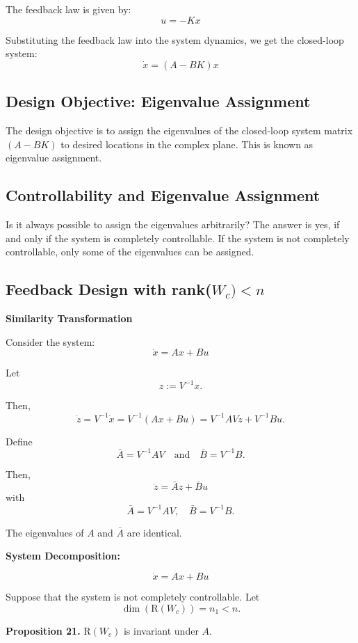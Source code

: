 \documentclass{article}
\begin{document}
The feedback law is given by:
\[
u = -Kx
\]

Substituting the feedback law into the system dynamics, we get the closed-loop system:
\[
\dot{x} = (A - BK)x
\]

\subsection{Design Objective: Eigenvalue Assignment}
The design objective is to assign the eigenvalues of the closed-loop system matrix $(A - BK)$ to desired locations in the complex plane. This is known as eigenvalue assignment.

\subsection{Controllability and Eigenvalue Assignment}
Is it always possible to assign the eigenvalues arbitrarily? The answer is yes, if and only if the system is completely controllable. If the system is not completely controllable, only some of the eigenvalues can be assigned.

\subsection{Feedback Design with rank($W_c)<n$}

\textbf{Similarity Transformation}

Consider the system:
\[
\dot{x} = Ax + Bu
\]

Let
\[
z := V^{-1}x.
\]

Then,
\[
\dot{z} = V^{-1}\dot{x} = V^{-1}(Ax + Bu) = V^{-1}AVz + V^{-1}Bu.
\]

Define
\[
\bar{A} = V^{-1}AV \quad \text{and} \quad \bar{B} = V^{-1}B.
\]

Then,
\[
\dot{z} = \bar{A}z + \bar{B}u
\]
with
\[
\bar{A} = V^{-1}AV, \quad \bar{B} = V^{-1}B.
\]

The eigenvalues of $A$ and $\bar{A}$ are identical.

\textbf{System Decomposition:}

\[ \dot{x} = Ax + Bu \]

Suppose that the system is not completely controllable. Let
\[
\dim(\text{R}(W_c)) = n_1 < n.
\]

\textbf{Proposition 21.} \(\text{R}(W_c)\) is invariant under \(A\).
\end{document}

